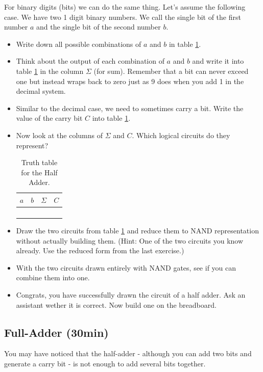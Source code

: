 \documentclass[10pt,a4paper]{article}
\begin{document}
For binary digits (bits) we can do the same thing. Let's assume the following case. We have two 1 digit binary numbers. We call the single bit of the first number $a$ and the single bit of the second number $b$.
\begin{itemize}
	\item Write down all possible combinations of $a$ and $b$ in table \ref{tab:half-adder-truth-table}.
	\item Think about the output of each combination of $a$ and $b$ and write it into table \ref{tab:half-adder-truth-table} in the column $\Sigma$ (for sum). Remember that a bit can never exceed one but instead wraps back to zero just as 9 does when you add 1 in the decimal system. 
	\item Similar to the decimal case, we need to sometimes carry a bit. Write the value of the carry bit $C$ into table \ref{tab:half-adder-truth-table}.
	\item Now look at the columns of $\Sigma$ and $C$. Which logical circuits do they represent?
	
	\begin{table}[H]
		\centering
		\begin{tabular}{|c|c||c|c|}
			\hline
			$a$ & $b$ & $\Sigma$   & $C$ \\ \hline
			&     &           &       \\ \hline
			&     &           &       \\ \hline
			&     &           &       \\ \hline
			&     &           &       \\ \hline
		\end{tabular}
		\caption{Truth table for the Half Adder.}
		\label{tab:half-adder-truth-table}
	\end{table}
	
		\item Draw the two circuits from table \ref{tab:half-adder-truth-table} and reduce them to NAND representation without actually building them. (Hint: One of the two circuits you know already. Use the reduced form from the last exercise.)
		\item With the two circuits drawn entirely with NAND gates, see if you can combine them into one.
		\item Congrats, you have successfully drawn the circuit of a half adder. Ask an assistant wether it is correct. Now build one on the breadboard.
\end{itemize}
\subsection{Full-Adder (30min)}
You may have noticed that the half-adder - although you can add two bits and generate a carry bit - is not enough to add several bits together.
\end{document}

